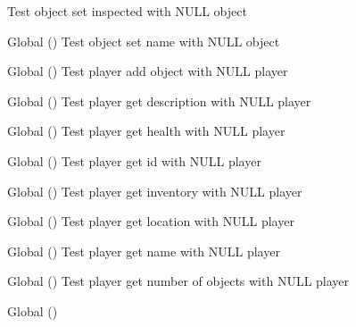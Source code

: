 \begin{DoxyRefList}
%
Test object set inspected with NULL object  
\item[Global \doxylink{object__test_8c_acf42b7e7be91ede243f2aaa56c4c9347}{test2\+\_\+object\+\_\+set\+\_\+name} ()]\label{test__test000064}%
%
Test object set name with NULL object  
\item[Global \doxylink{player__test_8c_a864d3935cf61953950b10df0e656306d}{test2\+\_\+player\+\_\+add\+\_\+object} ()]\label{test__test000113}%
%
Test player add object with NULL player  
\item[Global \doxylink{player__test_8c_a938f3fe4f38a162584c47f1e1c85c75d}{test2\+\_\+player\+\_\+get\+\_\+description} ()]\label{test__test000093}%
%
Test player get description with NULL player  
\item[Global \doxylink{player__test_8c_a0d0d1c26e649578825cab7206d78b5c5}{test2\+\_\+player\+\_\+get\+\_\+health} ()]\label{test__test000087}%
%
Test player get health with NULL player  
\item[Global \doxylink{player__test_8c_a9fa80f0c0e46b45eb9f1685b102a5826}{test2\+\_\+player\+\_\+get\+\_\+id} ()]\label{test__test000079}%
%
Test player get id with NULL player  
\item[Global \doxylink{player__test_8c_a8f3a62c708fbed848568841ca8b1cd26}{test2\+\_\+player\+\_\+get\+\_\+inventory} ()]\label{test__test000097}%
%
Test player get inventory with NULL player  
\item[Global \doxylink{player__test_8c_a4c5605fac4bd716e1dfb2744db4fa8a1}{test2\+\_\+player\+\_\+get\+\_\+location} ()]\label{test__test000101}%
%
Test player get location with NULL player  
\item[Global \doxylink{player__test_8c_a3aa908fd360b74e7786422260e8e16a0}{test2\+\_\+player\+\_\+get\+\_\+name} ()]\label{test__test000083}%
%
Test player get name with NULL player  
\item[Global \doxylink{player__test_8c_af795956906ac0779f168e882288257c8}{test2\+\_\+player\+\_\+get\+\_\+num\+\_\+objects} ()]\label{test__test000107}%
%
Test player get number of objects with NULL player  
\item[Global \doxylink{player__test_8c_aae715732b4bd9e99580340c109518d7e}{test2\+\_\+player\+\_\+get\+\_\+object\+\_\+from\+\_\+index} ()]\label{test__test000105}%

\end{DoxyRefList}
